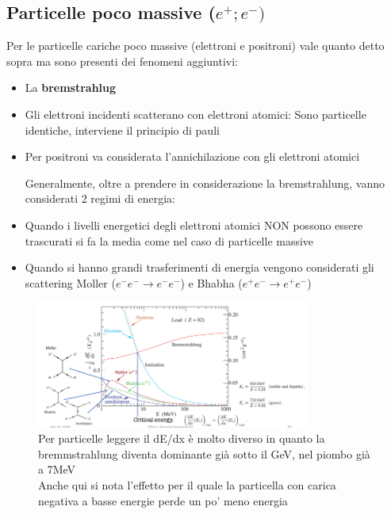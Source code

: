 \subsection*{Particelle poco massive ($e^{+} ; e^{-})$}
Per le particelle cariche poco massive (elettroni e positroni) vale quanto detto sopra ma sono presenti dei fenomeni aggiuntivi:
\begin{itemize}


    \item La \textbf{bremstrahlug}
    \item Gli elettroni incidenti scatterano con elettroni atomici: Sono particelle identiche, interviene il principio di pauli
    \item Per positroni va considerata l'annichilazione con gli elettroni atomici

    Generalmente, oltre a prendere in considerazione la bremstrahlung, vanno considerati 2 regimi di energia:

    \item Quando i livelli energetici degli elettroni atomici NON possono essere trascurati si fa la media come nel caso di particelle massive
    \item Quando si hanno grandi trasferimenti di energia vengono considerati gli scattering Moller ($e^- e^- \to e^- e^-$) e Bhabha ($e^+ e^- \to e^+ e^-$)
\end{itemize}

\begin{figure}[H]
    \centering
    \includegraphics[width=0.8\textwidth,frame]{Chapters/images/Interazione_radiazione_materia/image-20220217021527324.png}
    \captionsetup{width=0.8\linewidth}
    \caption{Per particelle leggere il dE/dx è molto diverso in quanto la bremmstrahlung diventa dominante già sotto il GeV, nel piombo già a 7MeV \\ Anche qui si nota l'effetto per il quale la particella con carica negativa a basse energie perde un po' meno energia}
    \label{fig:electronloss}
\end{figure}

